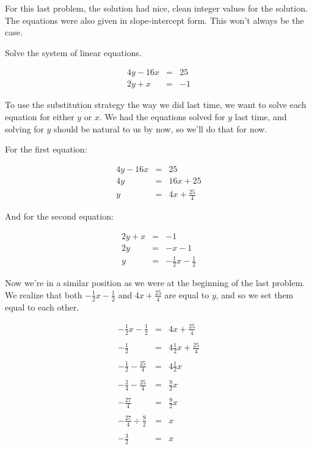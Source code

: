 For this last problem, the solution had nice, clean integer values for the solution.  The equations were also given in slope-intercept form.  This won't always be the case.

\begin{example}
Solve the system of linear equations.

$$\begin{array}{rcl}
4y - 16x & = & 25 \\
2y + x & = & -1 \end{array}$$

To use the substitution strategy the way we did last time, we want to solve each equation for either $y$ or $x$.  We had the equations solved for $y$ last time, and solving for $y$ should be natural to us by now, so we'll do that for now.

For the first equation:

$$\begin{array}{rcl}
4y - 16x & = & 25 \\
4y & = & 16x + 25 \\
y & = & 4x + \frac{25}{4} \end{array}$$

And for the second equation:

$$\begin{array}{rcl}
2y + x & = & -1 \\
2y & = & -x -1 \\
y & = & -\frac{1}{2}x - \frac{1}{2} \end{array}$$

Now we're in a similar position as we were at the beginning of the last problem.  We realize that both $-\frac{1}{2}x - \frac{1}{2}$ and $4x + \frac{25}{4}$ are equal to $y$, and so we set them equal to each other.

$$\begin{array}{rcl}
-\frac{1}{2}x - \frac{1}{2} & = & 4x + \frac{25}{4}\\ \\
-\frac{1}{2} & = & 4\frac{1}{2}x + \frac{25}{4}\\ \\
-\frac{1}{2} - \frac{25}{4} & = & 4\frac{1}{2}x\\ \\
-\frac{2}{4} - \frac{25}{4} & = & \frac{9}{2}x\\ \\
-\frac{27}{4} & = & \frac{9}{2}x\\ \\
-\frac{27}{4} \div \frac{9}{2}& = & x \\ \\
-\frac{3}{2} & = & x\\
\end{array}$$


\end{example}
